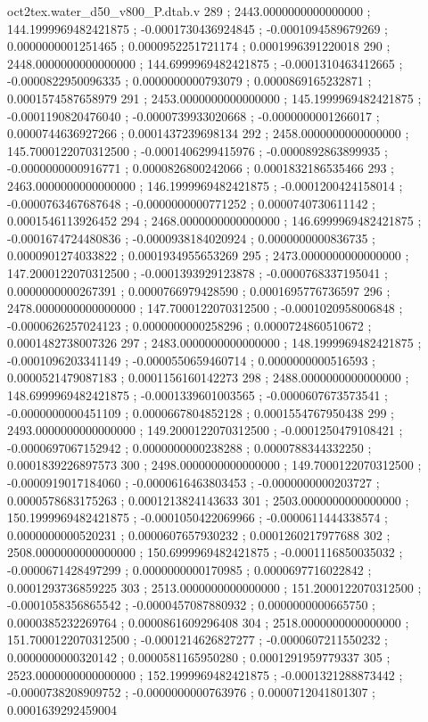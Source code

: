 \begin{filecontents}[overwrite]{oct2tex.water_d50_v800_P.dtab.v}
289 ; 2443.0000000000000000 ; 144.1999969482421875 ; -0.0001730436924845 ; -0.0001094589679269 ; 0.0000000001251465 ; 0.0000952251721174 ; 0.0001996391220018
290 ; 2448.0000000000000000 ; 144.6999969482421875 ; -0.0001310463412665 ; -0.0000822950096335 ; 0.0000000000793079 ; 0.0000869165232871 ; 0.0001574587658979
291 ; 2453.0000000000000000 ; 145.1999969482421875 ; -0.0001190820476040 ; -0.0000739933020668 ; -0.0000000001266017 ; 0.0000744636927266 ; 0.0001437239698134
292 ; 2458.0000000000000000 ; 145.7000122070312500 ; -0.0001406299415976 ; -0.0000892863899935 ; -0.0000000000916771 ; 0.0000826800242066 ; 0.0001832186535466
293 ; 2463.0000000000000000 ; 146.1999969482421875 ; -0.0001200424158014 ; -0.0000763467687648 ; -0.0000000000771252 ; 0.0000740730611142 ; 0.0001546113926452
294 ; 2468.0000000000000000 ; 146.6999969482421875 ; -0.0001674724480836 ; -0.0000938184020924 ; 0.0000000000836735 ; 0.0000901274033822 ; 0.0001934955653269
295 ; 2473.0000000000000000 ; 147.2000122070312500 ; -0.0001393929123878 ; -0.0000768337195041 ; 0.0000000000267391 ; 0.0000766979428590 ; 0.0001695776736597
296 ; 2478.0000000000000000 ; 147.7000122070312500 ; -0.0001020958006848 ; -0.0000626257024123 ; 0.0000000000258296 ; 0.0000724860510672 ; 0.0001482738007326
297 ; 2483.0000000000000000 ; 148.1999969482421875 ; -0.0001096203341149 ; -0.0000550659460714 ; 0.0000000000516593 ; 0.0000521479087183 ; 0.0001156160142273
298 ; 2488.0000000000000000 ; 148.6999969482421875 ; -0.0001339601003565 ; -0.0000607673573541 ; -0.0000000000451109 ; 0.0000667804852128 ; 0.0001554767950438
299 ; 2493.0000000000000000 ; 149.2000122070312500 ; -0.0001250479108421 ; -0.0000697067152942 ; 0.0000000000238288 ; 0.0000788344332250 ; 0.0001839226897573
300 ; 2498.0000000000000000 ; 149.7000122070312500 ; -0.0000919017184060 ; -0.0000616463803453 ; -0.0000000000203727 ; 0.0000578683175263 ; 0.0001213824143633
301 ; 2503.0000000000000000 ; 150.1999969482421875 ; -0.0001050422069966 ; -0.0000611444338574 ; 0.0000000000520231 ; 0.0000607657930232 ; 0.0001260217977688
302 ; 2508.0000000000000000 ; 150.6999969482421875 ; -0.0001116850035032 ; -0.0000671428497299 ; 0.0000000000170985 ; 0.0000697716022842 ; 0.0001293736859225
303 ; 2513.0000000000000000 ; 151.2000122070312500 ; -0.0001058356865542 ; -0.0000457087880932 ; 0.0000000000665750 ; 0.0000385232269764 ; 0.0000861609296408
304 ; 2518.0000000000000000 ; 151.7000122070312500 ; -0.0001214626827277 ; -0.0000607211550232 ; 0.0000000000320142 ; 0.0000581165950280 ; 0.0001291959779337
305 ; 2523.0000000000000000 ; 152.1999969482421875 ; -0.0001321288873442 ; -0.0000738208909752 ; -0.0000000000763976 ; 0.0000712041801307 ; 0.0001639292459004

\end{filecontents}
